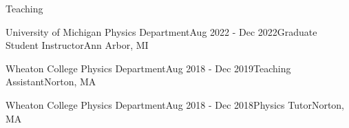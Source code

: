 \documentclass{resume} %
\begin{document}
\begin{rSection}{Teaching}

    

\begin{rSubsection}{University of Michigan Physics Department}{Aug 2022 - Dec 2022}{Graduate Student Instructor}{Ann Arbor, MI}

\end{rSubsection}

\begin{rSubsection}{Wheaton College Physics Department}{Aug 2018 - Dec 2019}{Teaching Assistant}{Norton, MA}

\end{rSubsection}

\begin{rSubsection}{Wheaton College Physics Department}{Aug 2018 - Dec 2018}{Physics Tutor}{Norton, MA}

\end{rSubsection}

\end{rSection}
\end{document}
